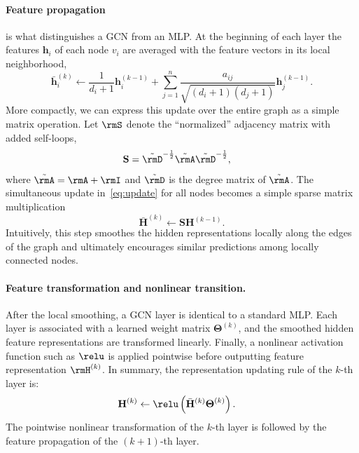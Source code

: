 \paragraph{Feature propagation} is what distinguishes a GCN from an MLP. 
At the beginning of each layer the features $\mathbf{h}_i$ of each node $v_i$ are averaged with  the feature vectors  in its local neighborhood, 
\begin{equation}
    \bar{\mathbf{h}}_i^{(k)} \leftarrow \frac{1}{d_i + 1} \mathbf{h}_i^{(k-1)}+\sum_{j=1}^n \frac{a_{ij}}{\sqrt{(d_i + 1) (d_j + 1)}}\mathbf{h}_j^{(k-1)}.\label{eq:update}
\end{equation}
More compactly, we can express this update over the entire graph as a simple matrix operation.  Let $\rmS$ denote the ``normalized'' adjacency matrix with added self-loops, 
\begin{align} 
\label{eq:propagation_matrix}
    \mathbf{S} & = \tilde{\rmD}^{-\frac{1}{2}} \tilde{\rmA} \tilde{\rmD}^{-\frac{1}{2}},
\end{align}
where $\tilde{\rmA} = \rmA + \rmI$ and $\tilde{\rmD}$ is the degree matrix of $\tilde{\rmA}$. The simultaneous update in~\autoref{eq:update} for all nodes becomes a simple sparse matrix multiplication
%
\begin{equation}
    \bar{\mathbf{H}}^{(k)} \leftarrow \mathbf{S} \mathbf{H}^{(k-1)}.
%
\end{equation}
%
Intuitively, this step smoothes the hidden representations locally along the edges of the graph and ultimately encourages similar predictions among locally connected nodes.


\paragraph{Feature transformation and nonlinear transition.} 
After the local smoothing, a GCN layer is identical to a standard MLP.  Each layer is associated with a learned weight matrix $\boldsymbol{\Theta}^{(k)}$, and the smoothed hidden feature representations are transformed linearly. 
Finally, a nonlinear activation function such as $\relu$ is applied pointwise before outputting feature representation $\rmH^{(k)}$. In summary, the representation updating rule of the $k$-th layer is: 
\begin{align} \label{eq:gcn_propagation}
    \mathbf{H}^{(k)} & \leftarrow  \relu \left( \bar{\mathbf{H}}^{(k)} \boldsymbol{\Theta}^{(k)}\right). 
\end{align}
The pointwise nonlinear transformation of the $k$-th layer is followed by the feature propagation of the $(k+1)$-th layer.
